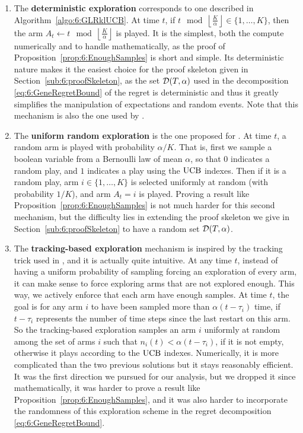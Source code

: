 \begin{enumerate}
    \item
    The \textbf{deterministic exploration}
    corresponds to one described in Algorithm~\ref{algo:6:GLRklUCB}.
    At time $t$, if $t \mod \left\lfloor \frac{K}{\alpha}\right\rfloor \in \{1,\dots,K\}$, then the arm $A_t \leftarrow t \mod \left\lfloor \frac{K}{\alpha}\right\rfloor$ is played.
    It is the simplest, both the compute numerically and to handle mathematically, as the proof of Proposition~\ref{prop:6:EnoughSamples} is short and simple.
    Its deterministic nature makes it the easiest choice for the proof skeleton given in Section~\ref{sub:6:proofSkeleton}, as the set $\mathcal{D}(T,\alpha)$ used in the decomposition \eqref{eq:6:GeneRegretBound} of the regret is deterministic and thus it greatly simplifies the manipulation of expectations and random events.
    Note that this mechanism is also the one used by \MUCB{} \cite{CaoZhenKvetonXie18}.

    \item
    The \textbf{uniform random exploration} is the one proposed for \CUSUMUCB{} \cite{LiuLeeShroff17}.
    At time $t$, a random arm is played with probability $\alpha/K$. That is, first we sample a boolean variable from a Bernoulli law of mean $\alpha$, so that $0$ indicates a random play, and $1$ indicates a play using the $\mathrm{UCB}$ indexes. Then if it is a random play, arm $i\in\{1,\dots,K\}$ is selected uniformly at random (with probability $1/K$), and arm $A_t = i$ is played.
    Proving a result like Proposition~\ref{prop:6:EnoughSamples} is not much harder for this second mechanism,
    but the difficulty lies in extending the proof skeleton we give in Section~\ref{sub:6:proofSkeleton} to have a random set $\mathcal{D}(T,\alpha)$.

    \item
    The \textbf{tracking-based exploration} mechanism is inspired by the tracking trick used in \cite{Garivier16BAI}, and it is actually quite intuitive.
    At any time $t$, instead of having a uniform probability of sampling forcing an exploration of every arm, it can make sense to force exploring arms that are not explored enough. This way, we actively enforce that each arm have enough samples.
    At time $t$, the goal is for any arm $i$ to have been sampled more than $\alpha (t - \tau_i)$ time, if $t - \tau_i$ represents the number of time steps since the last restart on this arm.
    So the tracking-based exploration samples an arm $i$ uniformly at random among the set of arms $i$ such that $n_i(t) < \alpha (t - \tau_i)$, if it is not empty, otherwise it plays according to the $\mathrm{UCB}$ indexes.
    Numerically, it is more complicated than the two previous solutions but it stays reasonably efficient.
    It was the first direction we pursued for our analysis, but we dropped it since mathematically, it was harder to prove a result like Proposition~\ref{prop:6:EnoughSamples}, and it was also harder to incorporate the randomness of this exploration scheme in the regret decomposition \eqref{eq:6:GeneRegretBound}.
\end{enumerate}

